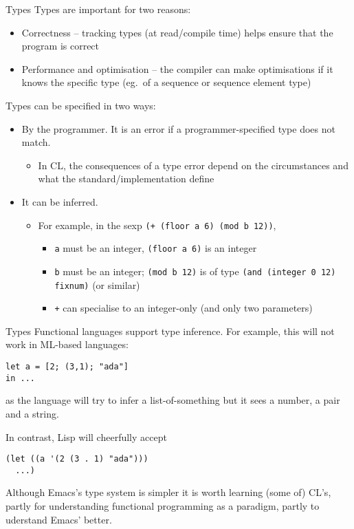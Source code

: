 \documentclass[presentation]{beamer}
\begin{document}
\begin{frame}[fragile]{Types}
  Types are important for two reasons:
  \begin{itemize}
  \item Correctness -- tracking types (at read/compile time) helps ensure that the program is correct
  \item Performance and optimisation -- the compiler can make optimisations if it knows the specific type (eg.\ of a sequence or sequence element type)
  \end{itemize}
  Types can be specified in two ways:
  \begin{itemize}
  \item By the programmer.  It is an error if a programmer-specified type does not match.
    \begin{itemize}
    \item In CL, the consequences of a type error depend on the circumstances and what the standard/implementation define
    \end{itemize}
  \item It can be inferred.
    \begin{itemize}
    \item For example, in the sexp \texttt{(+ (floor a 6) (mod b 12))},
      \begin{itemize}
      \item \texttt{a} must be an integer, \texttt{(floor a 6)} is an integer
      \item \texttt{b} must be an integer; \texttt{(mod b 12)} is of type \texttt{(and (integer 0 12) fixnum)} (or similar)
      \item \texttt{+} can specialise to an integer-only (and only two parameters)
      \end{itemize}
    \end{itemize}
  \end{itemize}

\end{frame}

\begin{frame}[fragile]{Types}
  Functional languages support type inference.  For example, this will not work in ML-based languages:
\begin{verbatim}
let a = [2; (3,1); "ada"]
in ...
\end{verbatim}
as the language will try to infer a list-of-something but it sees a number, a pair and a string.

In contrast, Lisp will cheerfully accept
\begin{verbatim}
(let ((a '(2 (3 . 1) "ada")))
  ...)
\end{verbatim}

Although Emacs's type system is simpler it is worth learning (some of) CL's, partly for understanding functional programming as a paradigm, partly to uderstand Emacs' better.
  
\end{frame}
\end{document}

